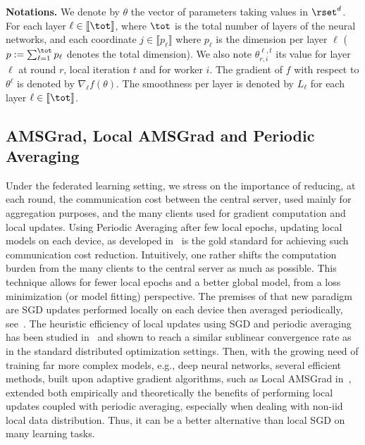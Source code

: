 \documentclass[nohyperref]{article}
\begin{document}
\noindent\textbf{Notations.} We denote by $\theta$ the vector of parameters taking values in $\rset^d$. 
For each layer $\ell \in \llbracket \tot \rrbracket$, where $\tot$ is the total number of layers of the neural networks, and each coordinate $j \in \llbracket p_\ell \rrbracket$ where $p_\ell$ is the dimension per layer $\ell$ ($p := \sum_{\ell=1}^\tot p_\ell$ denotes the total dimension).
We also note $\theta_{r,i}^{\ell,t}$ its value for layer $\ell$ at round $r$, local iteration $t$ and for worker $i$.
The gradient of $f$ with respect to $\theta^\ell$ is denoted by $\nabla_{\ell} f(\theta)$.
The smoothness per layer is denoted by $L_\ell$ for each layer $\ell \in \llbracket \tot \rrbracket$.


\subsection{AMSGrad, Local AMSGrad and Periodic Averaging}
Under the federated learning setting, we stress on the importance of reducing, at each round, the communication cost between the central server, used mainly for aggregation purposes, and the many clients used for gradient computation and local updates.
Using Periodic Averaging after few local epochs, updating local models on each device, as developed in~\citet{mcmahan2017communication} is the gold standard for achieving such communication cost reduction.
Intuitively, one rather shifts the computation burden from the many clients to the central server as much as possible. 
This technique allows for fewer local epochs and a better global model, from a loss minimization (or model fitting) perspective.
The premises of that new paradigm are SGD updates performed locally on each device then averaged periodically, see~\citet{konevcny2016federated, zhou2017convergence}.
The heuristic efficiency of local updates using SGD and periodic averaging has been studied in~\citet{stich2018local,yu2019linear} and shown to reach a similar sublinear convergence rate as in the standard distributed optimization settings.
Then, with the growing need of training far more complex models, e.g., deep neural networks, several efficient methods, built upon adaptive gradient algorithms, such as Local AMSGrad in~\citet{chen2020toward}, extended both empirically and theoretically the benefits of performing local updates coupled with periodic averaging, especially when dealing with non-iid local data distribution. Thus, it can be a better alternative than local SGD on many learning tasks.
\end{document}

